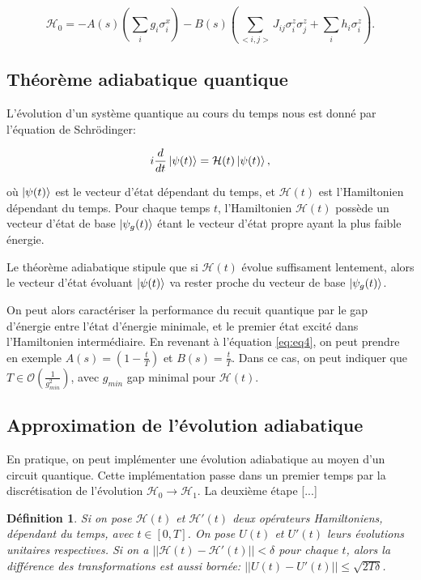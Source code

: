 \documentclass[12pt,a4paper]{article}
\newtheorem{definition}{Définition}
\begin{document}
\begin{equation}
    \mathcal{H}_0 = - A(s) (\displaystyle\sum_{i} g_i \sigma_i^x ) - B(s) ( \displaystyle\sum_{<i, j>} J_{ij} \sigma_i^z \sigma_j^z + \displaystyle\sum_{i} h_i \sigma_i^z ).
    \label{eq:eq4}
\end{equation}

\subsection*{Théorème adiabatique quantique}
L'évolution d'un système quantique au cours du temps nous est donné par l'équation de Schrödinger:

\begin{equation}
    i \frac{d}{dt} \ket{\psi(t)} = \mathcal{H}(t) \ket{\psi(t)},
\end{equation}

où $\ket{\psi(t)}$ est le vecteur d'état dépendant du temps, et $\mathcal{H}(t)$ est l'Hamiltonien dépendant du temps. Pour chaque temps $t$, l'Hamiltonien $\mathcal{H}(t)$ possède un vecteur d'état de base $\ket{\psi_g (t)}$ étant le vecteur d'état propre ayant la plus faible énergie.

Le théorème adiabatique stipule que si $\mathcal{H}(t)$ évolue suffisament lentement, alors le vecteur d'état évoluant $\ket{\psi(t)}$ va rester proche du vecteur de base $\ket{\psi_g (t)}$.

On peut alors caractériser la performance du recuit quantique par le gap d'énergie entre l'état d'énergie minimale, et le premier état excité dans l'Hamiltonien intermédiaire. En revenant à l'équation \ref{eq:eq4}, on peut prendre en exemple $A(s) = (1 - \frac{t}{T})$ et $B(s) = \frac{t}{T}$. Dans ce cas, on peut indiquer que $T \in \mathcal{O}( \frac{1}{g_{min}^2})$, avec $g_{min}$ gap minimal pour $\mathcal{H}(t)$.

\subsection*{Approximation de l'évolution adiabatique}
En pratique, on peut implémenter une évolution adiabatique au moyen d'un circuit quantique. Cette implémentation passe dans un premier temps par la discrétisation de l'évolution $\mathcal{H}_0 \to \mathcal{H}_1$. La deuxième étape [...]

\medbreak

\begin{definition}
    Si on pose $\mathcal{H}(t)$ et $\mathcal{H}'(t)$ deux opérateurs Hamiltoniens, dépendant du temps, avec $t \in [0, T]$. On pose $U(t)$ et $U'(t)$ leurs évolutions unitaires respectives. Si on a $|| \mathcal{H}(t) - \mathcal{H}'(t) || < \delta$ pour chaque $t$, alors la différence des transformations est aussi bornée: $||U(t) - U'(t)|| \leq  \sqrt{2T\delta}$.
    \label{def:1}
\end{definition}
\end{document}
